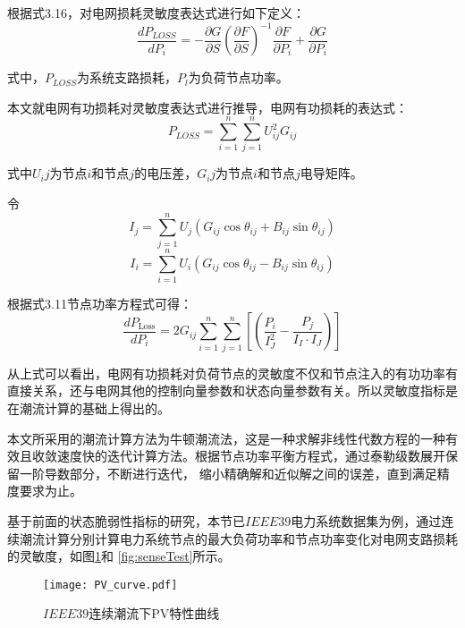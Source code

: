 根据式3.16，对电网损耗灵敏度表达式进行如下定义：
\begin{equation}
  \frac{d P_{LOSS}}{d P_i}=-\frac{\partial G}{\partial S}\left(\frac{\partial F}{\partial S}\right)^{-1} \frac{\partial F}{\partial P_i}+\frac{\partial G}{\partial P_i}
  \end{equation}

式中，$P_{LOSS}$为系统支路损耗，$P_l$为负荷节点功率。

本文就电网有功损耗对灵敏度表达式进行推导，电网有功损耗的表达式：
\begin{equation}
  P_{L O S S}=\sum_{i=1}^{n} \sum_{j=1}^{n} U_{i j}^{2} G_{i j}
  \end{equation}

式中$U_ij$为节点$i$和节点$j$的电压差，$G_ij$为节点$i$和节点$j$电导矩阵。

令$$I_j = \sum_{j=1}^{n} U_{j}\left(G_{i j} \cos \theta_{i j}+B_{i j} \sin \theta_{i j}\right)$$
$$I_i = \sum_{i=1}^{n} U_{i}\left(G_{i j} \cos \theta_{i j}-B_{i j} \sin \theta_{i j}\right)$$

根据式3.11节点功率方程式可得：
\begin{equation}
  \frac{d P_{\text {Loss}}}{d P_{i}}=2 G_{i j} \sum_{i=1}^{n} \sum_{j=1}^{n}\left[\left(\frac{P_{i}}{I_{J}^{2}}-\frac{P_{j}}{I_{I} \cdot I_{J}}\right)\right]
  \end{equation}

从上式可以看出，电网有功损耗对负荷节点的灵敏度不仅和节点注入的有功功率有直接关系，还与电网其他的控制向量参数和状态向量参数有关。所以灵敏度指标是在潮流计算的基础上得出的。

本文所采用的潮流计算方法为牛顿潮流法，这是一种求解非线性代数方程的一种有效且收敛速度快的迭代计算方法。根据节点功率平衡方程式，通过泰勒级数展开保留一阶导数部分，不断进行迭代，
缩小精确解和近似解之间的误差，直到满足精度要求为止。



基于前面的状态脆弱性指标的研究，本节已$IEEE39$电力系统数据集为例，通过连续潮流计算分别计算电力系统节点的最大负荷功率和节点功率变化对电网支路损耗的灵敏度，如图\ref{fig:PV_curve}和
\ref{fig:senseTest}所示。
\begin{figure}[H] 
  \centering
  \texttt{[image: PV\_curve.pdf]}
  \caption{$IEEE39$连续潮流下PV特性曲线}
  \label{fig:PV_curve}
\end{figure}

